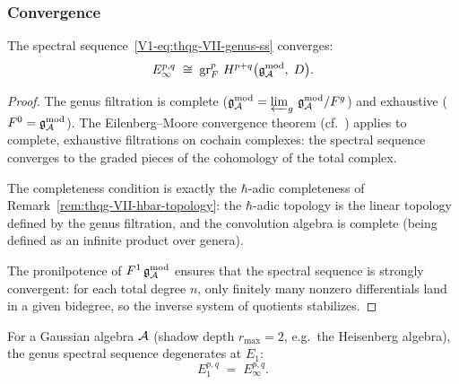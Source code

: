 \subsubsection{Convergence}

\begin{theorem}
\label{thm:thqg-VII-ss-convergence}
The spectral
sequence~\eqref{V1-eq:thqg-VII-genus-ss} converges:
\begin{equation}%
E_\infty^{p,q}
\;\cong\;
\gr^p_F\, H^{p+q}\bigl(\gAmod,\; D\bigr).
\end{equation}
\end{theorem}

\begin{proof}
The genus filtration is complete
($\mathfrak{g}_{\mathcal{A}}^{\mathrm{mod}} = \varprojlim_g\, \mathfrak{g}_{\mathcal{A}}^{\mathrm{mod}} / F^g$) and
exhaustive ($F^0 = \mathfrak{g}_{\mathcal{A}}^{\mathrm{mod}}$). The Eilenberg--Moore
convergence theorem (cf.\ \cite[Theorem~5.5.1]{Wei94})
applies to complete, exhaustive filtrations on cochain
complexes: the spectral sequence converges to the graded
pieces of the cohomology of the total complex.

The completeness condition is exactly the $\hbar$-adic
completeness of
Remark~\ref{rem:thqg-VII-hbar-topology}: the
$\hbar$-adic topology is the linear topology defined by
the genus filtration, and the convolution algebra is complete
(being defined as an infinite product over genera).

The pronilpotence of $F^1\,\mathfrak{g}_{\mathcal{A}}^{\mathrm{mod}}$ ensures that the spectral
sequence is strongly convergent: for each total degree $n$,
only finitely many nonzero differentials land in a given
bidegree, so the inverse system of quotients stabilizes.
\end{proof}

\begin{corollary}
\label{cor:thqg-VII-gaussian-degeneration}
For a Gaussian algebra $\mathcal{A}$ \textup{(}shadow depth $r_{\max} = 2$,
e.g.\ the Heisenberg algebra\textup{)}, the genus spectral
sequence degenerates at $E_1$:
\begin{equation}%
E_1^{p,q} \;=\; E_\infty^{p,q}.
\end{equation}
\end{corollary}

